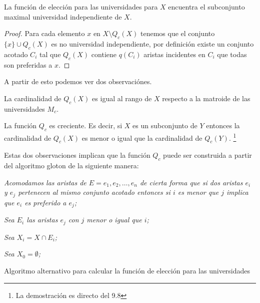 \begin{cor}
La función de elección para las universidades para $X$ encuentra el subconjunto maximal universidad independiente de $X$.
\end{cor}

\begin{proof}
Para cada elemento $x$ en $X\setminus Q_c(X)$ tenemos que el conjunto $\{x\}\cup Q_c(X)$ es no universidad independiente, por definición existe un conjunto acotado $C_i$ tal que $Q_c(X)$ contiene $q(C_i)$ aristas incidentes en $C_i$ que todas son preferidas a $x$.
\end{proof}

A partir de esto podemos ver dos observaciónes.

\begin{obs}
La cardinalidad de $Q_c(X)$ es igual al rango de $X$ respecto a la matroide de las universidades $M_c$. 
\end{obs}

\begin{obs}
La función $Q_c$ es creciente. Es decir, si $X$ es un subconjunto de $Y$ entonces la cardinalidad de $Q_c(X)$ es menor o igual que la cardinalidad de $Q_c(Y)$. \footnote{La demostración es directo del 9.8 } %
\end{obs} 

Estas dos observaciones implican que la función $Q_c$ puede ser construida a partir del algoritmo gloton de la siguiente manera:

\IncMargin{1em}
\begin{Algoritmo}[H]

\BlankLine
\emph{Acomodamos las aristas de $E=e_1,e_2,\dots,e_n$ de cierta forma que si dos aristas $e_i$ y $e_j$ pertenecen al mismo conjunto acotado entonces si $i$ es menor que $j$ implica que $e_i$ es preferido a $e_j$;}

\emph{Sea $E_i$ las aristas $e_j$ con $j$ menor o igual que $i$;}

\emph{Sea $X_i=X \cap E_i$;}

\emph{Sea $X_0 = \emptyset$;}


\caption{Algoritmo alternativo para calcular la función de elección para las universidades}
\end{Algoritmo}
\DecMargin{1em}

